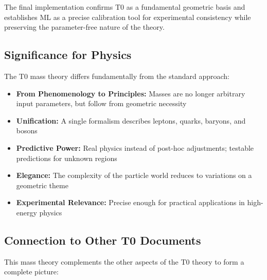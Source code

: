 	The final implementation confirms T0 as a fundamental geometric basis and establishes ML as a precise calibration tool for experimental consistency while preserving the parameter-free nature of the theory.
	
	\subsection{Significance for Physics}
	
	The T0 mass theory differs fundamentally from the standard approach:
	
	\begin{itemize}
		\item \textbf{From Phenomenology to Principles:} Masses are no longer arbitrary input parameters, but follow from geometric necessity
		
		\item \textbf{Unification:} A single formalism describes leptons, quarks, baryons, and bosons
		
		\item \textbf{Predictive Power:} Real physics instead of post-hoc adjustments; testable predictions for unknown regions
		
		\item \textbf{Elegance:} The complexity of the particle world reduces to variations on a geometric theme
		
		\item \textbf{Experimental Relevance:} Precise enough for practical applications in high-energy physics
	\end{itemize}
	
	\subsection{Connection to Other T0 Documents}
	
	This mass theory complements the other aspects of the T0 theory to form a complete picture:
	
	\begin{table}[h]
		\centering
		\small
		\caption{Integration of the mass theory into the overall T0 theory}
		\label{tab:integration}
	\end{table}
	
